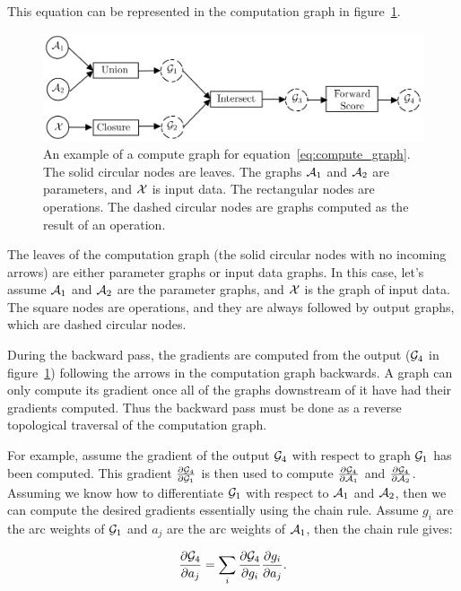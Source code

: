 This equation can be represented in the computation graph in
figure~\ref{fig:compute_graph}.

\begin{figure}
    \centering
    \includegraphics[scale=0.9]{figures/compute_graph}
    \caption{An example of a compute graph for equation~\ref{eq:compute_graph}.
    The solid circular nodes are leaves. The graphs $\mathcal{A}_1$ and $\mathcal{A}_2$ are
    parameters, and $\mathcal{X}$ is input data. The rectangular nodes are operations.
    The dashed circular nodes are graphs computed as the result of an
    operation.}
    \label{fig:compute_graph}
\end{figure}

The leaves of the computation graph (the solid circular nodes with no incoming
arrows) are either parameter graphs or input data graphs. In this case, let's
assume $\mathcal{A}_1$ and $\mathcal{A}_2$ are the parameter graphs, and $\mathcal{X}$ is the graph of
input data. The square nodes are operations, and they are always followed by
output graphs, which are dashed circular nodes.

During the backward pass, the gradients are computed from the output ($\mathcal{G}_4$
in figure~\ref{fig:compute_graph}) following the arrows in the computation
graph backwards. A graph can only compute its gradient once all of the graphs
downstream of it have had their gradients computed. Thus the backward pass must
be done as a reverse topological traversal of the computation graph.

For example, assume the gradient of the output $\mathcal{G}_4$ with respect to graph
$\mathcal{G}_1$ has been computed. This gradient $\frac{\partial \mathcal{G}_4}{\partial
\mathcal{G}_1}$ is then used to compute $\frac{\partial \mathcal{G}_4}{\partial \mathcal{A}_1}$ and
$\frac{\partial \mathcal{G}_4}{\partial \mathcal{A}_2}$. Assuming we know how to differentiate
$\mathcal{G}_1$ with respect to $\mathcal{A}_1$ and $\mathcal{A}_2$, then we can compute the desired
gradients essentially using the chain rule. Assume $g_i$ are the arc weights of
$\mathcal{G}_1$ and $a_j$ are the arc weights of $\mathcal{A}_1$, then the chain rule gives:

$$
\frac{\partial \mathcal{G}_4}{\partial a_j} =
    \sum_{i} \frac{\partial \mathcal{G}_4}{\partial g_i} \frac{\partial g_i}{\partial a_j}.
$$

